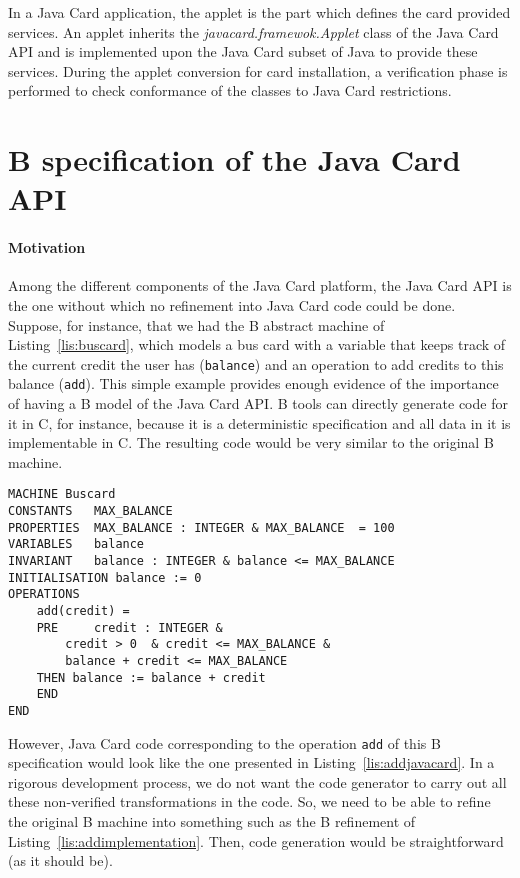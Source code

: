 \documentclass{llncs}
\begin{document}
In a Java Card application, the applet is the part which defines the card provided services. 
An applet inherits the \emph{javacard.framewok.Applet} class of the Java Card API and is
implemented upon the Java Card subset of Java to provide these services.  During the applet
conversion for card installation, a verification phase is performed to
check conformance of the classes to Java Card restrictions.

\section{B specification of the Java Card API}\label{sec:api-spec}

\paragraph{Motivation}
Among the different components of the Java Card platform, the Java
Card API is the one without which no refinement into Java Card code
could be done.  Suppose, for instance, that we had the B abstract
machine of Listing~\ref{lis:buscard}, which models a bus card with a
variable that keeps track of the current credit the user has
(\texttt{balance}) and an operation to add credits to this balance
(\texttt{add}). This simple example provides enough evidence of the
importance of having a B model of the Java Card API.  B tools can directly 
generate code for it in C, for instance, because it  is a deterministic specification and all data in
it is implementable in C.  The
resulting code would be very similar to the original B machine.

\begin{lstlisting}
MACHINE	Buscard
CONSTANTS	MAX_BALANCE
PROPERTIES	MAX_BALANCE : INTEGER & MAX_BALANCE  = 100
VARIABLES	balance
INVARIANT	balance : INTEGER & balance <= MAX_BALANCE 
INITIALISATION balance := 0
OPERATIONS
	add(credit) =
	PRE 	credit : INTEGER &  
		credit > 0  & credit <= MAX_BALANCE & 
		balance + credit <= MAX_BALANCE 
	THEN balance := balance + credit
	END
END
\end{lstlisting}

However, Java Card code corresponding to the operation \texttt{add} of
this B specification would look like the one presented in
Listing~\ref{lis:addjavacard}. In a rigorous development process, we do
not want the code generator to carry out all these non-verified
transformations in the code. So, we need to be able to refine the
original B machine into something such as the B refinement of
Listing~\ref{lis:addimplementation}. Then, code generation would be
straightforward (as it should be).
\end{document}
